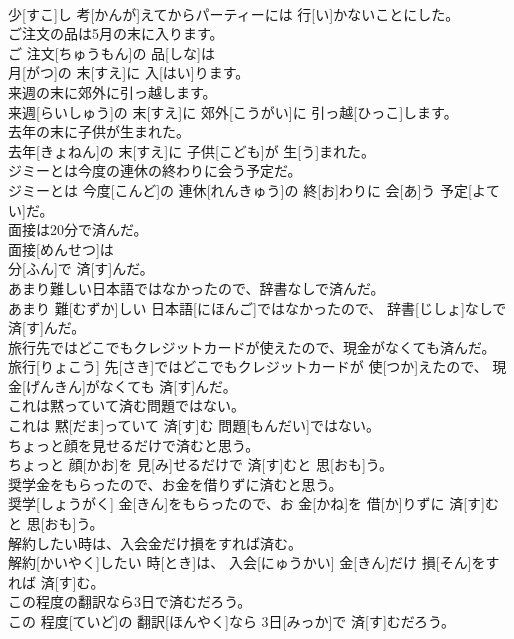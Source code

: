 \documentclass[8pt]{extreport}
\begin{document}
\begin{CJK}{UTF8}{min}
\\	少[すこ]し 考[かんが]えてからパーティーには 行[い]かないことにした。
\\	ご注文の品は5月の末に入ります。	
\\	ご 注文[ちゅうもん]の 品[しな]は 
\\	月[がつ]の 末[すえ]に 入[はい]ります。
\\	来週の末に郊外に引っ越します。	
\\	来週[らいしゅう]の 末[すえ]に 郊外[こうがい]に 引っ越[ひっこ]します。
\\	去年の末に子供が生まれた。	
\\	去年[きょねん]の 末[すえ]に 子供[こども]が 生[う]まれた。
\\	ジミーとは今度の連休の終わりに会う予定だ。	
\\	ジミーとは 今度[こんど]の 連休[れんきゅう]の 終[お]わりに 会[あ]う 予定[よてい]だ。
\\	面接は20分で済んだ。	
\\	面接[めんせつ]は 
\\	分[ふん]で 済[す]んだ。
\\	あまり難しい日本語ではなかったので、辞書なしで済んだ。	
\\	あまり 難[むずか]しい 日本語[にほんご]ではなかったので、 辞書[じしょ]なしで 済[す]んだ。
\\	旅行先ではどこでもクレジットカードが使えたので、現金がなくても済んだ。	
\\	旅行[りょこう] 先[さき]ではどこでもクレジットカードが 使[つか]えたので、 現金[げんきん]がなくても 済[す]んだ。
\\	これは黙っていて済む問題ではない。	
\\	これは 黙[だま]っていて 済[す]む 問題[もんだい]ではない。
\\	ちょっと顔を見せるだけで済むと思う。	
\\	ちょっと 顔[かお]を 見[み]せるだけで 済[す]むと 思[おも]う。
\\	奨学金をもらったので、お金を借りずに済むと思う。	
\\	奨学[しょうがく] 金[きん]をもらったので、お 金[かね]を 借[か]りずに 済[す]むと 思[おも]う。
\\	解約したい時は、入会金だけ損をすれば済む。	
\\	解約[かいやく]したい 時[とき]は、 入会[にゅうかい] 金[きん]だけ 損[そん]をすれば 済[す]む。
\\	この程度の翻訳なら3日で済むだろう。	
\\	この 程度[ていど]の 翻訳[ほんやく]なら 3日[みっか]で 済[す]むだろう。

\end{CJK}
\end{document}
